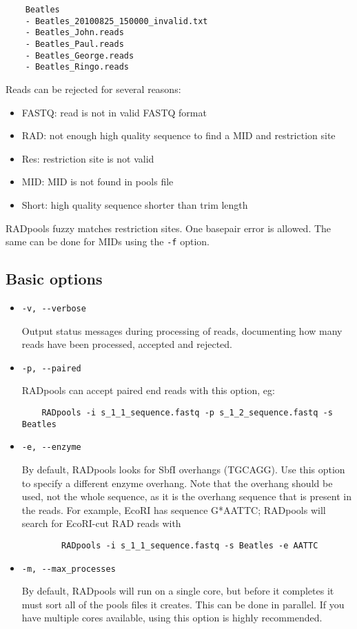 \documentclass[a4paper]{article}
\begin{document}
\begin{verbatim}
    Beatles
    - Beatles_20100825_150000_invalid.txt
    - Beatles_John.reads
    - Beatles_Paul.reads
    - Beatles_George.reads
    - Beatles_Ringo.reads
\end{verbatim}

Reads can be rejected for several reasons:
\begin{itemize}
    \item FASTQ: read is not in valid FASTQ format
    \item RAD: not enough high quality sequence to find a MID and restriction site
    \item Res: restriction site is not valid
    \item MID: MID is not found in pools file
    \item Short: high quality sequence shorter than trim length
\end{itemize}

RADpools fuzzy matches restriction sites. One basepair error is allowed. The same can be done for MIDs using the \verb|-f| option.

\subsection{Basic options}

\begin{itemize}
    \item \verb|-v, --verbose|

Output status messages during processing of reads, documenting how many reads have been processed, accepted and rejected.

    \item \verb|-p, --paired|

RADpools can accept paired end reads with this option, eg:
\begin{verbatim}
    RADpools -i s_1_1_sequence.fastq -p s_1_2_sequence.fastq -s Beatles
\end{verbatim}

    \item \verb|-e, --enzyme|
    
    By default, RADpools looks for SbfI overhangs (TGCAGG). Use this option to specify a different enzyme overhang. Note that the overhang should be used, not the whole sequence, as it is the overhang sequence that is present in the reads. For example, EcoRI has sequence G*AATTC; RADpools will search for EcoRI-cut RAD reads with
    \begin{verbatim}
        RADpools -i s_1_1_sequence.fastq -s Beatles -e AATTC
    \end{verbatim}

    \item \verb|-m, --max_processes|
    
    By default, RADpools will run on a single core, but before it completes it must sort all of the pools files it creates. This can be done in parallel. If you have multiple cores available, using this option is highly recommended.

\end{itemize}
\end{document}
